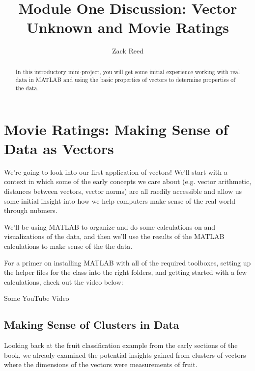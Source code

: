 \documentclass{ximera}
\author{Zack Reed}
\title{Module One Discussion: Vector Unknown and Movie Ratings}
\begin{document}
\begin{abstract}

    In this introductory mini-project, you will get some initial experience working with real data in MATLAB and using the basic properties of vectors to determine properties of the data.

\end{abstract}
\maketitle

\section{Movie Ratings: Making Sense of Data as Vectors}

  We're going to look into our first application of vectors! We'll start with a context in which some of the early concepts we care about (e.g. vector arithmetic, distances between vectors, vector norms) are all raedily accessible and allow us some initial insight into how we help computers make sense of the real world through nubmers. 

  We'll be using MATLAB to organize and do some calculations on and visualizations of the data, and then we'll use the results of the MATLAB calculations to make sense of the the data. 

  \begin{hint} 

    For a primer on installing MATLAB with all of the required toolboxes, setting up the helper files for the class into the right folders, and getting started with a few calculations, check out the video below:

    \begin{center}
      Some YouTube Video
    \end{center}

  \end{hint}

  \subsection{Making Sense of Clusters in Data}

  Looking back at the fruit classification example from the early sections of the book, we already examined the potential insights gained from clusters of vectors where the dimensions of the vectors were measurements of fruit. 
\end{document}
